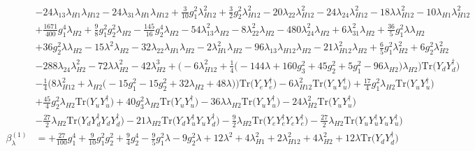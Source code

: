 {\begin{align}
 &-24 \lambda_{13} \lambda_{H1} \lambda_{H12} -24 \lambda_{31} \lambda_{H1} \lambda_{H12} +\frac{3}{10} g_{1}^{2} \lambda_{H12}^{2} +\frac{3}{2} g_{2}^{2} \lambda_{H12}^{2} -20 \lambda_{22} \lambda_{H12}^{2} -24 \lambda_{24} \lambda_{H12}^{2} -18 \lambda \lambda_{H12}^{2} -10 \lambda_{H1} \lambda_{H12}^{2} \nonumber \\ 
 &+\frac{1671}{400} g_{1}^{4} \lambda_{H2} +\frac{9}{8} g_{1}^{2} g_{2}^{2} \lambda_{H2} -\frac{145}{16} g_{2}^{4} \lambda_{H2} -54 \lambda_{13}^{2} \lambda_{H2} -8 \lambda_{22}^{2} \lambda_{H2} -480 \lambda_{24}^{2} \lambda_{H2} +6 \lambda_{31}^{2} \lambda_{H2} +\frac{36}{5} g_{1}^{2} \lambda \lambda_{H2} \nonumber \\ 
 &+36 g_{2}^{2} \lambda \lambda_{H2} -15 \lambda^{2} \lambda_{H2} -32 \lambda_{22} \lambda_{H1} \lambda_{H2} -2 \lambda_{H1}^{2} \lambda_{H2} -96 \lambda_{13} \lambda_{H12} \lambda_{H2} -21 \lambda_{H12}^{2} \lambda_{H2} +\frac{6}{5} g_{1}^{2} \lambda_{H2}^{2} +6 g_{2}^{2} \lambda_{H2}^{2} \nonumber \\ 
 &-288 \lambda_{24} \lambda_{H2}^{2} -72 \lambda \lambda_{H2}^{2} -42 \lambda_{H2}^{3} +\Big(-6 \lambda_{H12}^{2}  + \frac{1}{4} \Big(-144 \lambda  + 160 g_{3}^{2}  + 45 g_{2}^{2}  + 5 g_{1}^{2}  -96 \lambda_{H2} \Big)\lambda_{H2} \Big)\mbox{Tr}\Big({Y_d  Y_{d}^{\dagger}}\Big) \nonumber \\ 
 &-\frac{1}{4} \Big(8 \lambda_{H12}^{2}  + \lambda_{H2} \Big(-15 g_{1}^{2}  -15 g_{2}^{2}  + 32 \lambda_{H2}  + 48 \lambda \Big)\Big)\mbox{Tr}\Big({Y_e  Y_{e}^{\dagger}}\Big) -6 \lambda_{H12}^{2} \mbox{Tr}\Big({Y_u  Y_{u}^{\dagger}}\Big) +\frac{17}{4} g_{1}^{2} \lambda_{H2} \mbox{Tr}\Big({Y_u  Y_{u}^{\dagger}}\Big) \nonumber \\ 
 &+\frac{45}{4} g_{2}^{2} \lambda_{H2} \mbox{Tr}\Big({Y_u  Y_{u}^{\dagger}}\Big) +40 g_{3}^{2} \lambda_{H2} \mbox{Tr}\Big({Y_u  Y_{u}^{\dagger}}\Big) -36 \lambda \lambda_{H2} \mbox{Tr}\Big({Y_u  Y_{u}^{\dagger}}\Big) -24 \lambda_{H2}^{2} \mbox{Tr}\Big({Y_u  Y_{u}^{\dagger}}\Big) \nonumber \\ 
 &-\frac{27}{2} \lambda_{H2} \mbox{Tr}\Big({Y_d  Y_{d}^{\dagger}  Y_d  Y_{d}^{\dagger}}\Big) -21 \lambda_{H2} \mbox{Tr}\Big({Y_d  Y_{u}^{\dagger}  Y_u  Y_{d}^{\dagger}}\Big) -\frac{9}{2} \lambda_{H2} \mbox{Tr}\Big({Y_e  Y_{e}^{\dagger}  Y_e  Y_{e}^{\dagger}}\Big) -\frac{27}{2} \lambda_{H2} \mbox{Tr}\Big({Y_u  Y_{u}^{\dagger}  Y_u  Y_{u}^{\dagger}}\Big) \\ 
\beta_{\lambda}^{(1)} & =  
+\frac{27}{100} g_{1}^{4} +\frac{9}{10} g_{1}^{2} g_{2}^{2} +\frac{9}{4} g_{2}^{4} -\frac{9}{5} g_{1}^{2} \lambda -9 g_{2}^{2} \lambda +12 \lambda^{2} +4 \lambda_{H1}^{2} +2 \lambda_{H12}^{2} +4 \lambda_{H2}^{2} +12 \lambda \mbox{Tr}\Big({Y_d  Y_{d}^{\dagger}}\Big) \nonumber \\ 

\end{align}}
